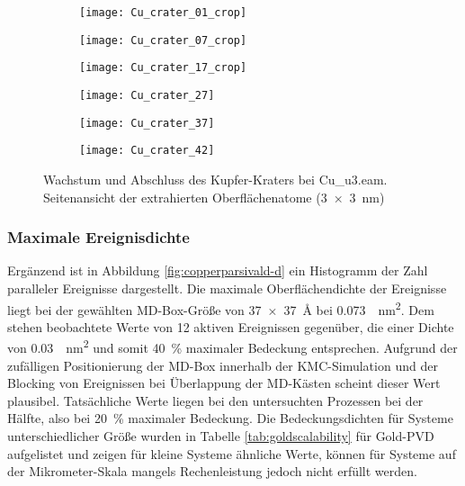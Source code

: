 \begin{figure}

  \captionsetup[subfigure]{justification=centering,singlelinecheck=false}
  \def\subfigwidth{0.32\textwidth}

  \begin{subfigure}[t]{\subfigwidth}
    \texttt{[image: Cu\_crater\_01\_crop]}
  \end{subfigure}
  \hfill
  \begin{subfigure}[t]{\subfigwidth}
    \texttt{[image: Cu\_crater\_07\_crop]}
  \end{subfigure}
  \hfill
  \begin{subfigure}[t]{\subfigwidth}
    \texttt{[image: Cu\_crater\_17\_crop]}
  \end{subfigure}

  \begin{subfigure}[t]{\subfigwidth}
    \texttt{[image: Cu\_crater\_27]}
  \end{subfigure}
  \hfill
  \begin{subfigure}[t]{\subfigwidth}
    \texttt{[image: Cu\_crater\_37]}
  \end{subfigure}
  \hfill
  \begin{subfigure}[t]{\subfigwidth}
    \texttt{[image: Cu\_crater\_42]}
  \end{subfigure}

  \caption{Wachstum und Abschluss des Kupfer-Kraters bei Cu\_u3.eam.\\
    Seitenansicht der extrahierten Oberflächenatome (\SI{3x3}{\nano\meter})
  }
  \label{fig:coppercrater}
\end{figure}

\subsubsection{Maximale Ereignisdichte}
Ergänzend ist in Abbildung \ref{fig:copperparsivald-d} ein Histogramm der Zahl paralleler Ereignisse dargestellt.
Die maximale Oberflächendichte der Ereignisse liegt bei der gewählten MD-Box-Größe von \SI{37x37}{\angstrom} bei \SI{0.073}{\per\nano\meter\squared}.
Dem stehen beobachtete Werte von 12 aktiven Ereignissen gegenüber, die einer Dichte von \SI{0.03}{\per\nano\meter\squared} und somit \SI{40}{\percent} maximaler Bedeckung entsprechen.
Aufgrund der zufälligen Positionierung der MD-Box innerhalb der KMC-Simulation und der Blocking von Ereignissen bei Überlappung der MD-Kästen scheint dieser Wert plausibel.
Tatsächliche Werte liegen bei den untersuchten Prozessen bei der Hälfte, also bei \SI{20}{\percent} maximaler Bedeckung.
Die Bedeckungsdichten für Systeme unterschiedlicher Größe wurden in Tabelle \ref{tab:goldscalability} für Gold-PVD aufgelistet und zeigen für kleine Systeme ähnliche Werte, können für Systeme auf der Mikrometer-Skala mangels Rechenleistung jedoch nicht erfüllt werden.
